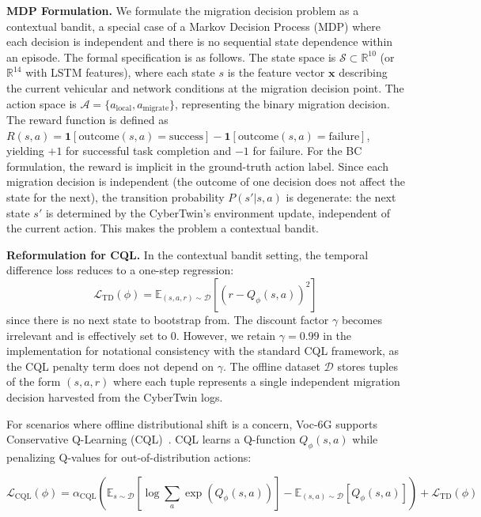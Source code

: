 \documentclass[10pt,letterpaper]{article}
\providecommand{\VocSixG}{Voc-6G}
\begin{document}
\textbf{MDP Formulation.}
We formulate the migration decision problem as a contextual bandit, a special case of a Markov Decision Process (MDP) where each decision is independent and there is no sequential state dependence within an episode. The formal specification is as follows. The state space is $\mathcal{S} \subset \mathbb{R}^{10}$ (or $\mathbb{R}^{14}$ with LSTM features), where each state $s$ is the feature vector $\mathbf{x}$ describing the current vehicular and network conditions at the migration decision point. The action space is $\mathcal{A} = \{a_{\text{local}}, a_{\text{migrate}}\}$, representing the binary migration decision. The reward function is defined as $R(s, a) = \mathbf{1}[\text{outcome}(s, a) = \text{success}] - \mathbf{1}[\text{outcome}(s, a) = \text{failure}]$, yielding $+1$ for successful task completion and $-1$ for failure. For the BC formulation, the reward is implicit in the ground-truth action label. Since each migration decision is independent (the outcome of one decision does not affect the state for the next), the transition probability $P(s' | s, a)$ is degenerate: the next state $s'$ is determined by the CyberTwin's environment update, independent of the current action. This makes the problem a contextual bandit.

\textbf{Reformulation for CQL.}
In the contextual bandit setting, the temporal difference loss reduces to a one-step regression:
\begin{equation}
\mathcal{L}_{\text{TD}}(\phi) = \mathbb{E}_{(s,a,r) \sim \mathcal{D}} \left[ \left( r - Q_\phi(s, a) \right)^2 \right]
\label{eq:td_loss}
\end{equation}
since there is no next state to bootstrap from. The discount factor $\gamma$ becomes irrelevant and is effectively set to 0. However, we retain $\gamma=0.99$ in the implementation for notational consistency with the standard CQL framework, as the CQL penalty term does not depend on $\gamma$. The offline dataset $\mathcal{D}$ stores tuples of the form $(s, a, r)$ where each tuple represents a single independent migration decision harvested from the CyberTwin logs.

For scenarios where offline distributional shift is a concern, \VocSixG{} supports Conservative Q-Learning (CQL)~\cite{kumar2020cql}. CQL learns a Q-function $Q_\phi(s, a)$ while penalizing Q-values for out-of-distribution actions:

\begin{equation}
\mathcal{L}_{\text{CQL}}(\phi) = \alpha_{\text{CQL}} \left( \mathbb{E}_{s \sim \mathcal{D}} \left[ \log \sum_a \exp(Q_\phi(s, a)) \right] - \mathbb{E}_{(s,a) \sim \mathcal{D}}[Q_\phi(s, a)] \right) + \mathcal{L}_{\text{TD}}(\phi)
\label{eq:cql}
\end{equation}
\end{document}
